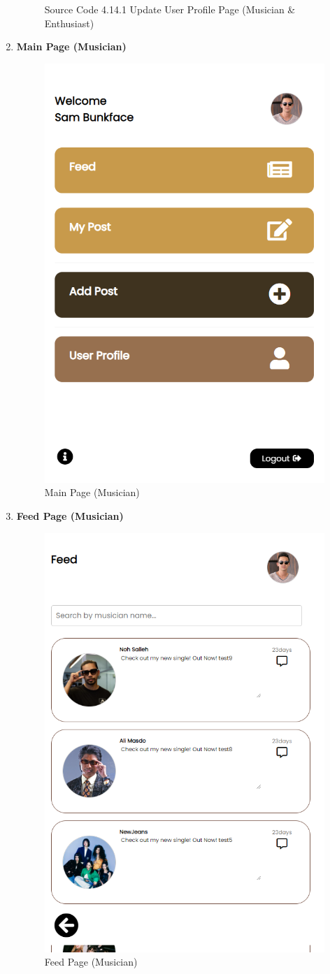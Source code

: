 \begin{enumerate}[1.]
\begin{figure}[h]
\begin{subfigure}[b]{0.7\textwidth}
            \label{fig:sub2}
        \end{subfigure}
        \caption*{Source Code 4.14.1 Update User Profile Page (Musician \& Enthusiast)}
        \label{fig:myfig54a}
    \end{figure}

    \item \textbf{Main Page (Musician)}
    \begin{figure}[h]
        \centering
        \includegraphics[width=0.5\linewidth]{mainmatter/images/frontend/ss/Main Page (Musician).png}
        \caption{Main Page (Musician)}
        \label{fig:myfig55}
    \end{figure}

    \item \textbf{Feed Page (Musician)}
    \begin{figure}[h]
        \centering
        \includegraphics[width=0.5\linewidth]{mainmatter/images/frontend/ss/Feed (Musician).png}
        \caption{Feed Page (Musician)}
        \label{fig:myfig56}
    \end{figure}


\end{enumerate}

